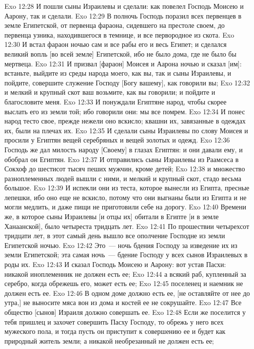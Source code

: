 \vs Exo 12:28 И пошли сыны Израилевы и сделали: как повелел Господь Моисею и Аарону, так и сделали.
\rsbpar\vs Exo 12:29 В полночь Господь поразил всех первенцев в земле Египетской, от первенца фараона, сидевшего на престоле своем, до первенца узника, находившегося в темнице, и все первородное из скота.
\vs Exo 12:30 И встал фараон ночью сам и все рабы его и весь Египет; и сделался великий вопль [во всей земле] Египетской, ибо не было дома, где не было бы мертвеца.
\vs Exo 12:31 И призвал [фараон] Моисея и Аарона ночью и сказал [им]: встаньте, выйдите из среды народа моего, как вы, так и сыны Израилевы, и пойдите, совершите служение Господу [Богу вашему], как говорили вы;
\vs Exo 12:32 и мелкий и крупный скот ваш возьмите, как вы говорили; и пойдите и благословите меня.
\vs Exo 12:33 И понуждали Египтяне народ, чтобы скорее выслать его из земли той; ибо говорили они: мы все помрем.
\rsbpar\vs Exo 12:34 И понес народ тесто свое, прежде нежели оно вскисло; квашни их, завязанные в одеждах их, были на плечах их.
\vs Exo 12:35 И сделали сыны Израилевы по слову Моисея и просили у Египтян вещей серебряных и вещей золотых и одежд.
\vs Exo 12:36 Господь же дал милость народу [Своему] в глазах Египтян: и они давали ему, и обобрал он Египтян.
\vs Exo 12:37 И отправились сыны Израилевы из Раамсеса в Сокхоф до шестисот тысяч пеших мужчин, кроме детей;
\vs Exo 12:38 и множество разноплеменных людей вышли с ними, и мелкий и крупный скот, стадо весьма большое.
\vs Exo 12:39 И испекли они из теста, которое вынесли из Египта, пресные лепешки, ибо оно еще не вскисло, потому что они выгнаны были из Египта и не могли медлить, и даже пищи не приготовили себе на дорогу.
\rsbpar\vs Exo 12:40 Времени же, в которое сыны Израилевы [и отцы их] обитали в Египте [и в земле Ханаанской], было четыреста тридцать лет.
\vs Exo 12:41 По прошествии четырехсот тридцати лет, в этот самый день вышло все ополчение Господне из земли Египетской ночью.
\vs Exo 12:42 Это~--- ночь бдения Господу за изведение их из земли Египетской; эта самая ночь~--- бдение Господу у всех сынов Израилевых в роды их.
\rsbpar\vs Exo 12:43 И сказал Господь Моисею и Аарону: вот устав Пасхи: никакой иноплеменник не должен есть ее;
\vs Exo 12:44 а всякий раб, купленный за серебро, когда обрежешь его, может есть ее;
\vs Exo 12:45 поселенец и наемник не должен есть ее.
\vs Exo 12:46 В одном доме должно есть ее, [не оставляйте от нее до утра,] не выносите мяса вон из дома и костей ее не сокрушайте.
\vs Exo 12:47 Все общество [сынов] Израиля должно совершать ее.
\vs Exo 12:48 Если же поселится у тебя пришлец и захочет совершить Пасху Господу, то обрежь у него всех мужеского пола, и тогда пусть он приступит к совершению ее и будет как природный житель земли; а никакой необрезанный не должен есть ее;
